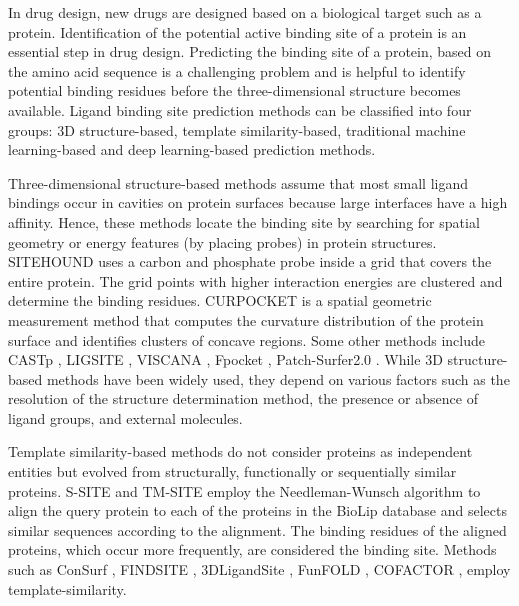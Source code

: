 \documentclass[journal=jcisd8,manuscript=article]{achemso}
\begin{document}
In drug design, new drugs are designed based on a biological target such as a protein. Identification of the potential active binding site of a protein is an essential step in drug design. Predicting the binding site of a protein, based on the amino acid sequence is a challenging problem and is helpful to identify potential binding residues before the three-dimensional structure becomes available. Ligand binding site prediction methods can be classified into four groups: 3D structure-based, template similarity-based, traditional machine learning-based and deep learning-based prediction methods.

Three-dimensional structure-based methods assume that most small ligand bindings occur in cavities on protein surfaces because large interfaces have a high affinity. Hence, these methods locate the binding site by searching for spatial geometry or energy features (by placing probes) in protein structures. SITEHOUND \cite{hernandez2009sitehound} uses a carbon and phosphate probe inside a grid that covers the entire protein. The grid points with higher interaction energies are clustered and determine the binding residues. CURPOCKET \cite{liu2020cb} is a spatial geometric measurement method that computes the curvature distribution of the protein surface and identifies clusters of concave regions. Some other methods include CASTp \cite{dundas2006castp}, LIGSITE \cite{hendlich1997ligsite}, VISCANA \cite{amari2006viscana}, Fpocket \cite{le2009fpocket}, Patch-Surfer2.0 \cite{zhu2015large}. While 3D structure-based methods have been widely used, they depend on various factors such as the resolution of the structure determination method, the presence or absence of ligand groups, and external molecules.

Template similarity-based methods do not consider proteins as independent entities but evolved from structurally, functionally or sequentially similar proteins. S-SITE and TM-SITE \cite{yang2013protein} employ the Needleman-Wunsch algorithm to align the query protein to each of the proteins in the BioLip \cite{yang2012biolip} database and selects similar sequences according to the alignment. The binding residues of the aligned proteins, which occur more frequently, are considered the binding site. Methods such as ConSurf \cite{glaser2003consurf}, FINDSITE \cite{brylinski2008threading}, 3DLigandSite \cite{wass20103dligandsite}, FunFOLD \cite{roche2011funfold}, COFACTOR \cite{roy2012recognizing}, employ template-similarity.
\end{document}
